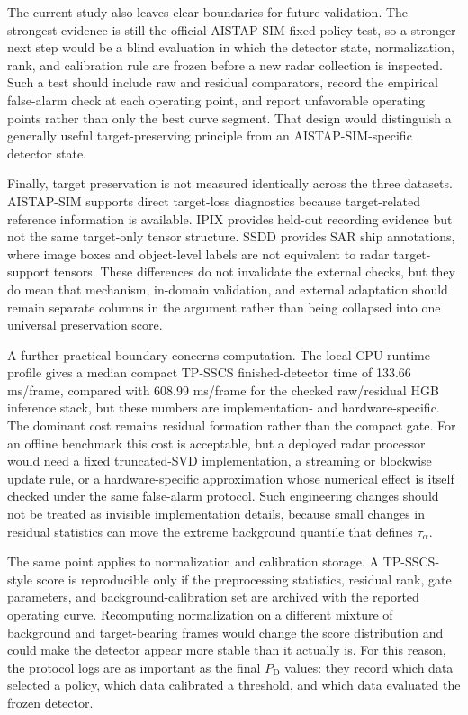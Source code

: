 \documentclass[journal]{IEEEtran}
\begin{document}
The current study also leaves clear boundaries for future validation. The strongest evidence is still the official AISTAP-SIM fixed-policy test, so a stronger next step would be a blind evaluation in which the detector state, normalization, rank, and calibration rule are frozen before a new radar collection is inspected. Such a test should include raw and residual comparators, record the empirical false-alarm check at each operating point, and report unfavorable operating points rather than only the best curve segment. That design would distinguish a generally useful target-preserving principle from an AISTAP-SIM-specific detector state.

Finally, target preservation is not measured identically across the three datasets. AISTAP-SIM supports direct target-loss diagnostics because target-related reference information is available. IPIX provides held-out recording evidence but not the same target-only tensor structure. SSDD provides SAR ship annotations, where image boxes and object-level labels are not equivalent to radar target-support tensors. These differences do not invalidate the external checks, but they do mean that mechanism, in-domain validation, and external adaptation should remain separate columns in the argument rather than being collapsed into one universal preservation score.

A further practical boundary concerns computation. The local CPU runtime profile gives a median compact TP-SSCS finished-detector time of 133.66 ms/frame, compared with 608.99 ms/frame for the checked raw/residual HGB inference stack, but these numbers are implementation- and hardware-specific. The dominant cost remains residual formation rather than the compact gate. For an offline benchmark this cost is acceptable, but a deployed radar processor would need a fixed truncated-SVD implementation, a streaming or blockwise update rule, or a hardware-specific approximation whose numerical effect is itself checked under the same false-alarm protocol. Such engineering changes should not be treated as invisible implementation details, because small changes in residual statistics can move the extreme background quantile that defines $\tau_\alpha$.

The same point applies to normalization and calibration storage. A TP-SSCS-style score is reproducible only if the preprocessing statistics, residual rank, gate parameters, and background-calibration set are archived with the reported operating curve. Recomputing normalization on a different mixture of background and target-bearing frames would change the score distribution and could make the detector appear more stable than it actually is. For this reason, the protocol logs are as important as the final $P_{\mathrm{D}}$ values: they record which data selected a policy, which data calibrated a threshold, and which data evaluated the frozen detector.
\end{document}
